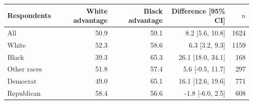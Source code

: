 \begin{tabular}{lrrrr}
\toprule
Respondents & White advantage & Black advantage & Difference [95\% CI] & $n$ \\
\midrule
All & 50.9 & 59.1 & 8.2 [5.6, 10.8] & 1624 \\
White & 52.3 & 58.6 & 6.3 [3.2, 9.3] & 1159 \\
Black & 39.3 & 65.3 & 26.1 [18.0, 34.1] & 168 \\
Other races & 51.8 & 57.4 & 5.6 [-0.5, 11.7] & 297 \\
Democrat & 49.0 & 65.1 & 16.1 [12.6, 19.6] & 771 \\
Republican & 58.4 & 56.6 & -1.8 [-6.0, 2.5] & 608 \\
\bottomrule
\end{tabular}
